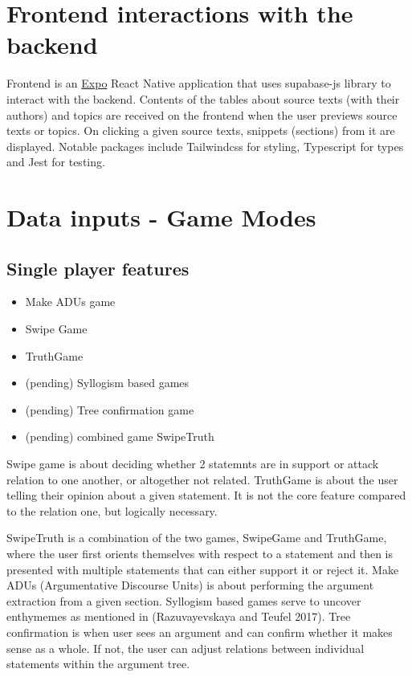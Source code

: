 \documentclass{article}
\begin{document}
\section{Frontend interactions with the backend}

Frontend is an \href{https://expo.dev/}{Expo} React Native application that uses supabase-js library to interact with the backend.
Contents of the tables about source texts (with their authors) and topics are received on the frontend when the user previews source texts or topics. On clicking a given source texts, snippets (sections) from it are displayed.
Notable packages include Tailwindcss for styling, Typescript for types and Jest for testing. 

\section{Data inputs - Game Modes}
\subsection{Single player features}
\begin{itemize}
  \item Make ADUs game
  \item Swipe Game
  \item TruthGame 
  \item (pending) Syllogism based games
  \item (pending) Tree confirmation game
  \item (pending) combined game SwipeTruth
\end{itemize}
Swipe game is about deciding whether 2 statemnts are in support or attack relation to one another, or altogether not related.
TruthGame is about the user telling their opinion about a given statement. It is not the core feature compared to the relation one, but logically necessary.

SwipeTruth is a combination of the two games, SwipeGame and TruthGame, where the user first orients themselves with respect to a statement and then is presented with multiple statements that can either support it or reject it.
Make ADUs (Argumentative Discourse Units) is about performing the argument extraction from a given section.
Syllogism based games serve to uncover enthymemes as mentioned in (Razuvayevskaya and Teufel 2017). 
Tree confirmation is when user sees an argument and can confirm whether it makes sense as a whole. If not, the user can adjust relations between individual statements within the argument tree.
\end{document}
